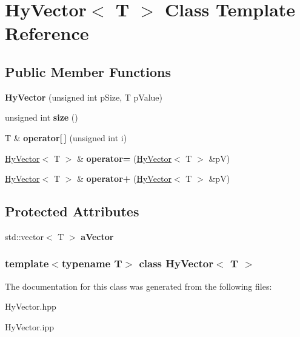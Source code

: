 \hypertarget{classHyVector}{
\section{HyVector$<$ T $>$ Class Template Reference}
\label{classHyVector}
}
\subsection*{Public Member Functions}
\begin{DoxyCompactItemize}
\item 
\hypertarget{classHyVector_a987e45b2bd7b48f6477627e45ee42260}{
{\bfseries HyVector} (unsigned int pSize, T pValue)}
\label{classHyVector_a987e45b2bd7b48f6477627e45ee42260}

\item 
\hypertarget{classHyVector_ac6aaa55924da374e1e426b851d3a9d55}{
unsigned int {\bfseries size} ()}
\label{classHyVector_ac6aaa55924da374e1e426b851d3a9d55}

\item 
\hypertarget{classHyVector_a40a43d3132b57a8ce72272d1ab51dda1}{
T \& {\bfseries operator\mbox{[}$\,$\mbox{]}} (unsigned int i)}
\label{classHyVector_a40a43d3132b57a8ce72272d1ab51dda1}

\item 
\hypertarget{classHyVector_aef5b59473d843e798ca95ee380e6f2af}{
\hyperlink{classHyVector}{HyVector}$<$ T $>$ \& {\bfseries operator=} (\hyperlink{classHyVector}{HyVector}$<$ T $>$ \&pV)}
\label{classHyVector_aef5b59473d843e798ca95ee380e6f2af}

\item 
\hypertarget{classHyVector_aa805e3695693a5458453072525b26c3f}{
\hyperlink{classHyVector}{HyVector}$<$ T $>$ \& {\bfseries operator+} (\hyperlink{classHyVector}{HyVector}$<$ T $>$ \&pV)}
\label{classHyVector_aa805e3695693a5458453072525b26c3f}

\end{DoxyCompactItemize}
\subsection*{Protected Attributes}
\begin{DoxyCompactItemize}
\item 
\hypertarget{classHyVector_a21b8ea7a1a5f5bb5604f59522dc31d0f}{
std::vector$<$ T $>$ {\bfseries aVector}}
\label{classHyVector_a21b8ea7a1a5f5bb5604f59522dc31d0f}

\end{DoxyCompactItemize}
\subsubsection*{template$<$typename T$>$ class HyVector$<$ T $>$}



The documentation for this class was generated from the following files:\begin{DoxyCompactItemize}
\item 
HyVector.hpp\item 
HyVector.ipp\end{DoxyCompactItemize}
